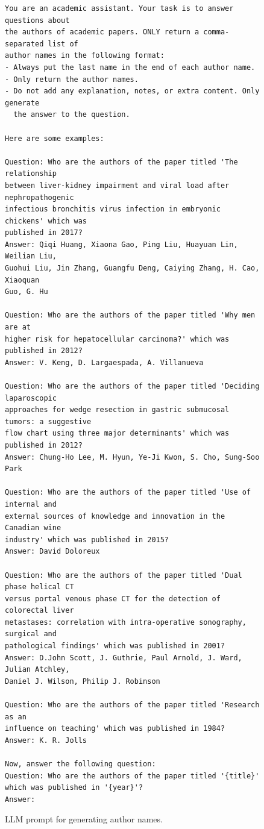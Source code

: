 \documentclass[11pt]{article}
\begin{document}
\begin{figure}[h]
\centering
\begin{tcolorbox}[colback=gray!5, colframe=gray!80, boxrule=0.5pt, arc=2mm, title=\textbf{LLM Prompt for Generating Author Names}]
\small
\begin{verbatim}
You are an academic assistant. Your task is to answer questions about
the authors of academic papers. ONLY return a comma-separated list of
author names in the following format:
- Always put the last name in the end of each author name.
- Only return the author names.
- Do not add any explanation, notes, or extra content. Only generate
  the answer to the question.

Here are some examples:

Question: Who are the authors of the paper titled 'The relationship
between liver-kidney impairment and viral load after nephropathogenic
infectious bronchitis virus infection in embryonic chickens' which was
published in 2017?
Answer: Qiqi Huang, Xiaona Gao, Ping Liu, Huayuan Lin, Weilian Liu,
Guohui Liu, Jin Zhang, Guangfu Deng, Caiying Zhang, H. Cao, Xiaoquan
Guo, G. Hu

Question: Who are the authors of the paper titled 'Why men are at
higher risk for hepatocellular carcinoma?' which was published in 2012?
Answer: V. Keng, D. Largaespada, A. Villanueva

Question: Who are the authors of the paper titled 'Deciding laparoscopic
approaches for wedge resection in gastric submucosal tumors: a suggestive
flow chart using three major determinants' which was published in 2012?
Answer: Chung-Ho Lee, M. Hyun, Ye-Ji Kwon, S. Cho, Sung-Soo Park

Question: Who are the authors of the paper titled 'Use of internal and
external sources of knowledge and innovation in the Canadian wine
industry' which was published in 2015?
Answer: David Doloreux

Question: Who are the authors of the paper titled 'Dual phase helical CT
versus portal venous phase CT for the detection of colorectal liver
metastases: correlation with intra-operative sonography, surgical and
pathological findings' which was published in 2001?
Answer: D.John Scott, J. Guthrie, Paul Arnold, J. Ward, Julian Atchley,
Daniel J. Wilson, Philip J. Robinson

Question: Who are the authors of the paper titled 'Research as an
influence on teaching' which was published in 1984?
Answer: K. R. Jolls

Now, answer the following question:
Question: Who are the authors of the paper titled '{title}' which was published in '{year}'?
Answer:
\end{verbatim}
\end{tcolorbox}
\caption{LLM prompt for generating author names.}
\label{fig:prompt_verbose}
\end{figure}
\end{document}
